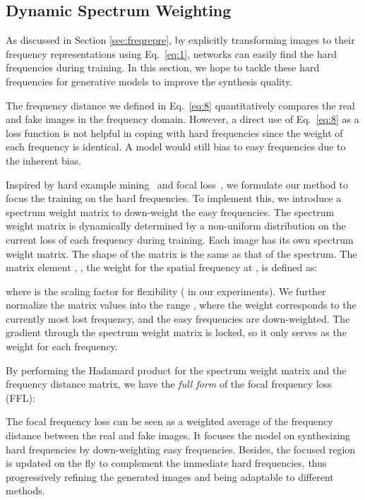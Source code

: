\documentclass[10pt,twocolumn,letterpaper]{article}
\begin{document}
\subsection{Dynamic Spectrum Weighting}
\label{sec:weightmatrix}



As discussed in Section \ref{sec:freqrepre}, by explicitly transforming images to their frequency representations using Eq.~\eqref{eq:1}, networks can easily find the hard frequencies during training.
In this section, we hope to tackle these hard frequencies for generative models to improve the synthesis quality.
\fi

The frequency distance we defined in Eq.~\eqref{eq:8} quantitatively compares the real and fake images in the frequency domain.
However, a direct use of Eq.~\eqref{eq:8} as a loss function is not helpful in coping with hard frequencies since the weight of each frequency is identical. A model would still bias to easy frequencies due to the inherent bias. 

Inspired by hard example mining~\cite{hempartmodel,ohem} and focal loss~\cite{focalloss}, we formulate our method to focus the training on the hard frequencies. To implement this, we introduce a spectrum weight matrix to down-weight the easy frequencies.
The spectrum weight matrix is dynamically determined by a non-uniform distribution on the current loss of each frequency during training.
Each image has its own spectrum weight matrix.
The shape of the matrix is the same as that of the spectrum.
The matrix element , \ie, the weight for the spatial frequency at , is defined as:

where  is the scaling factor for flexibility ( in our experiments). We further normalize the matrix values into the range , where the weight  corresponds to the currently most lost frequency, and the easy frequencies are down-weighted. The gradient through the spectrum weight matrix is locked, so it only serves as the weight for each frequency.

By performing the Hadamard product for the spectrum weight matrix and the frequency distance matrix, we have the \textit{full form} of the focal frequency loss (FFL):

The focal frequency loss can be seen as a weighted average of the frequency distance between the real and fake images.
It focuses the model on synthesizing hard frequencies by down-weighting easy frequencies. Besides, the focused region is updated on the fly to complement the immediate hard frequencies, thus progressively refining the generated images and being adaptable to different methods.
\end{document}
